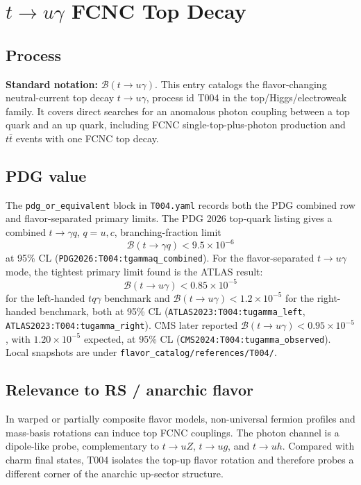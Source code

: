 
\section{\texorpdfstring{\(t\to u\gamma\)}{t -> u gamma} FCNC Top Decay}

\subsection*{Process}
\textbf{Standard notation:} \(\mathcal{B}(t\to u\gamma)\).
This entry catalogs the flavor-changing neutral-current top decay
\(t\to u\gamma\), process id T004 in the top/Higgs/electroweak family.  It
covers direct searches for an anomalous photon coupling between a top quark and
an up quark, including FCNC single-top-plus-photon production and \(t\bar t\)
events with one FCNC top decay.

\subsection*{PDG value}
The \texttt{pdg\_or\_equivalent} block in \texttt{T004.yaml} records both the
PDG combined row and flavor-separated primary limits.  The PDG 2026 top-quark
listing gives a combined
\(t\to\gamma q\), \(q=u,c\), branching-fraction limit
\[
  \mathcal{B}(t\to\gamma q) < 9.5\times 10^{-6}
\]
at 95\% CL (\texttt{PDG2026:T004:tgammaq\_combined}).  For the
flavor-separated \(t\to u\gamma\) mode, the tightest primary limit found is the
ATLAS result:
\[
  \mathcal{B}(t\to u\gamma) < 0.85\times 10^{-5}
\]
for the left-handed \(tq\gamma\) benchmark and
\(\mathcal{B}(t\to u\gamma)<1.2\times10^{-5}\) for the right-handed benchmark,
both at 95\% CL (\texttt{ATLAS2023:T004:tugamma\_left},
\texttt{ATLAS2023:T004:tugamma\_right}).  CMS later reported
\(\mathcal{B}(t\to u\gamma)<0.95\times10^{-5}\), with
\(1.20\times10^{-5}\) expected, at 95\% CL
(\texttt{CMS2024:T004:tugamma\_observed}).  Local snapshots are under
\texttt{flavor\_catalog/references/T004/}.

\subsection*{Relevance to RS / anarchic flavor}
In warped or partially composite flavor models, non-universal fermion profiles
and mass-basis rotations can induce top FCNC couplings.  The photon channel is
a dipole-like probe, complementary to \(t\to uZ\), \(t\to ug\), and \(t\to uh\).
Compared with charm final states, T004 isolates the top-up flavor rotation and
therefore probes a different corner of the anarchic up-sector structure.

